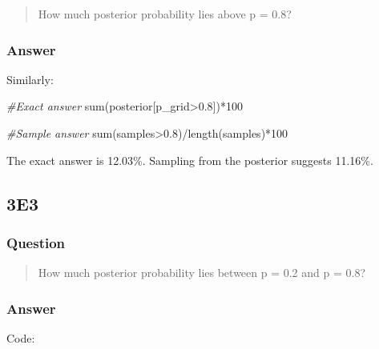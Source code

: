 \documentclass[
]{book}
\newenvironment{Shaded}{\begin{snugshade}}{\end{snugshade}}
\newcommand{\CommentTok}[1]{\textcolor[rgb]{0.56,0.35,0.01}{\textit{#1}}}
\newcommand{\DecValTok}[1]{\textcolor[rgb]{0.00,0.00,0.81}{#1}}
\newcommand{\FloatTok}[1]{\textcolor[rgb]{0.00,0.00,0.81}{#1}}
\newcommand{\FunctionTok}[1]{\textcolor[rgb]{0.00,0.00,0.00}{#1}}
\newcommand{\NormalTok}[1]{#1}
\newcommand{\SpecialCharTok}[1]{\textcolor[rgb]{0.00,0.00,0.00}{#1}}
\begin{document}
\begin{quote}
How much posterior probability lies above p = 0.8?
\end{quote}

\hypertarget{answer-16}{%
\subsubsection*{Answer}\label{answer-16}}

Similarly:

\begin{Shaded}
\begin{Highlighting}[]
\CommentTok{\#Exact answer}
\FunctionTok{sum}\NormalTok{(posterior[p\_grid}\SpecialCharTok{\textgreater{}}\FloatTok{0.8}\NormalTok{])}\SpecialCharTok{*}\DecValTok{100}

\CommentTok{\#Sample answer}
\FunctionTok{sum}\NormalTok{(samples}\SpecialCharTok{\textgreater{}}\FloatTok{0.8}\NormalTok{)}\SpecialCharTok{/}\FunctionTok{length}\NormalTok{(samples)}\SpecialCharTok{*}\DecValTok{100}
\end{Highlighting}
\end{Shaded}

The exact answer is 12.03\%. Sampling from the posterior suggests 11.16\%.

\hypertarget{e3-1}{%
\subsection*{3E3}\label{e3-1}}

\hypertarget{question-17}{%
\subsubsection*{Question}\label{question-17}}

\begin{quote}
How much posterior probability lies between p = 0.2 and p = 0.8?
\end{quote}

\hypertarget{answer-17}{%
\subsubsection*{Answer}\label{answer-17}}

Code:
\end{document}
